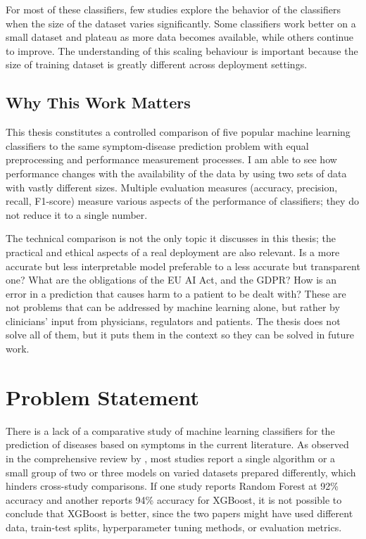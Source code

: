 For most of these classifiers, few studies explore the behavior of the classifiers when the size of the dataset varies significantly. Some classifiers work better on a small dataset and plateau as more data becomes available, while others continue to improve. The understanding of this scaling behaviour is important because the size of training dataset is greatly different across deployment settings.

\subsection{Why This Work Matters}

This thesis constitutes a controlled comparison of five popular machine learning classifiers to the same symptom-disease prediction problem with equal preprocessing and performance measurement processes. I am able to see how performance changes with the availability of the data by using two sets of data with vastly different sizes. Multiple evaluation measures (accuracy, precision, recall, F1-score) measure various aspects of the performance of classifiers; they do not reduce it to a single number.

The technical comparison is not the only topic it discusses in this thesis; the practical and ethical aspects of a real deployment are also relevant. Is a more accurate but less interpretable model preferable to a less accurate but transparent one? What are the obligations of the EU AI Act, and the GDPR? How is an error in a prediction that causes harm to a patient to be dealt with? These are not problems that can be addressed by machine learning alone, but rather by clinicians' input from physicians, regulators and patients. The thesis does not solve all of them, but it puts them in the context so they can be solved in future work.

\section{Problem Statement}
\label{sec:problem_statement}

There is a lack of a comparative study of machine learning classifiers for the prediction of diseases based on symptoms in the current literature. As observed in the comprehensive review by \citet{Ahsan2022}, most studies report a single algorithm or a small group of two or three models on varied datasets prepared differently, which hinders cross-study comparisons. If one study reports Random Forest at 92\% accuracy and another reports 94\% accuracy for XGBoost, it is not possible to conclude that XGBoost is better, since the two papers might have used different data, train-test splits, hyperparameter tuning methods, or evaluation metrics.

